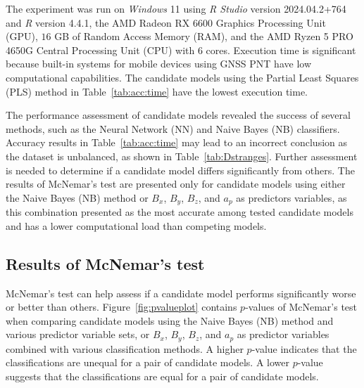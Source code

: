 \let\LaTeXcline\cline\documentclass[sn-mathphys-num]{sn-jnl}\let\cline\LaTeXcline
\begin{document}
The experiment was run on \textit{Windows} 11 using \textit{R Studio} version 2024.04.2+764 and \textit{R} version 4.4.1, the AMD Radeon RX 6600 Graphics Processing Unit (GPU), $16$ GB of Random Access Memory (RAM), and the AMD Ryzen 5 PRO 4650G Central Processing Unit (CPU) with $6$ cores. Execution time is significant because built-in systems for mobile devices using GNSS PNT have low computational capabilities. The candidate models using the Partial Least Squares (PLS) method in Table~\ref{tab:acc:time} have the lowest execution time.

The performance assessment of candidate models revealed the success of several methods, such as the Neural Network (NN) and Naive Bayes (NB) classifiers. Accuracy results in Table~\ref{tab:acc:time} may lead to an incorrect conclusion as the dataset is unbalanced, as shown in Table~\ref{tab:Dstranges}. Further assessment is needed to determine if a candidate model differs significantly from others. The results of
McNemar’s test are presented only for candidate models using either the Naive Bayes (NB) method or $B_{x}$, $B_{y}$, $B_{z}$, and $a_{p}$ as predictors variables, as this combination presented as the most accurate among tested candidate models and has a lower computational load than competing models.

\subsection{Results of McNemar's test}

McNemar’s test can help assess if a candidate model performs significantly worse or better than others. Figure~\ref{fig:pvalueplot} contains $p$-values of McNemar's test when comparing candidate models using the Naive Bayes (NB) method and various predictor variable sets, or $B_{x}$, $B_{y}$, $B_{z}$, and $a_{p}$ as predictor variables combined with various classification methods. A higher $p$-value indicates that the classifications are unequal for a pair of candidate models. A lower $p$-value suggests that the classifications are equal for a pair of candidate models.
\end{document}
